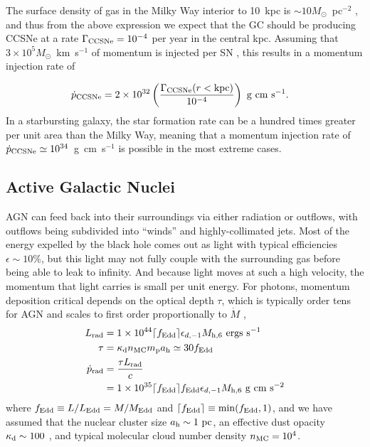 \documentclass[preprint2]{aastex}
\newcommand{\mhsix}{M_{\rm h,6}\xspace}
\begin{document}
The surface density of gas in the Milky Way interior to 10~kpc is $\sim 10 M_{\odot}$~pc$^{-2}$ \citep{Kalberla:2009a}, and thus from the above expression we expect that the GC should be producing CCSNe at a rate $\Gamma_{\rm CCSNe} = 10^{-4}$ per year in the central kpc. Assuming that $3 \times 10^{5} M_{\odot}$~{\rm km~s}$^{-1}$ of momentum is injected per SN \citep{Kim:2015a}, this results in a momentum injection rate of 

\begin{align}
\dot{p}_{\rm CCSNe} &= 2 \times 10^{32} \left(\frac{\Gamma_{\rm CCSNe} (r < {\rm kpc})}{10^{-4}}\right)~{\rm g~cm~s}^{-1}\label{eq:psne}.
\end{align}
In a starbursting galaxy, the star formation rate can be a hundred times greater per unit area than the Milky Way, meaning that a momentum injection rate of $\dot{p}_{\rm CCSNe} \simeq 10^{34}$~{\rm g~cm~s}$^{-1}$ is possible in the most extreme cases.

\subsection{Active Galactic Nuclei}\label{subsec:agn}

AGN can feed back into their surroundings via either radiation or outflows, with outflows being subdivided into ``winds'' and highly-collimated jets. Most of the energy expelled by the black hole comes out as light with typical efficiencies $\epsilon \sim 10\%$, but this light may not fully couple with the surrounding gas before being able to leak to infinity. And because light moves at such a high velocity, the momentum that light carries is small per unit energy. For photons, momentum deposition critical depends on the optical depth $\tau$, which is typically order tens for AGN \citep{Nenkova:2008b} and scales to first order proportionally to $\dot{M}$ \citep{Netzer:2006a},
\begin{align}
L_{\rm rad} &= 1 \times 10^{44} \lceil f_{\rm Edd} \rceil \epsilon_{d,-1} \mhsix~{\rm ergs~s}^{-1}\\
\tau &= \kappa_{\rm d} n_{\rm MC} m_{\rm p} a_{\rm h} \simeq 30 f_{\rm Edd}\label{eq:agntau}\\
\dot{p}_{\rm rad} &= \frac{\tau L_{\rm rad}}{c}\nonumber\\
&=1 \times 10^{35} \lceil f_{\rm Edd} \rceil f_{\rm Edd} \epsilon_{d,-1} \mhsix ~{\rm g~cm~s}^{-2}\label{eq:pagnrad}
\end{align}
where $f_{\rm Edd} \equiv L/L_{\rm Edd} = M/M_{\rm Edd}$ and $\lceil f_{\rm Edd} \rceil \equiv \min(f_{\rm Edd},1)$, and we have assumed that the nuclear cluster size $a_{\rm h} \sim 1~{\rm pc}$, an effective dust opacity $\kappa_{\rm d} \sim 100$ \citep{Li:2001a}, and typical molecular cloud number density $n_{\rm MC} = 10^{4}$.
\end{document}
